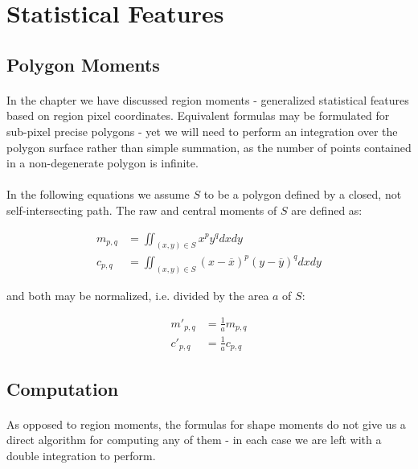 
\section{Statistical Features}

\subsection{Polygon Moments}

\paragraph*{}
In the  chapter we have discussed region moments - generalized statistical features based on region pixel coordinates. Equivalent formulas may be formulated for sub-pixel precise polygons - yet we will need to perform an integration over the polygon surface rather than simple summation, as the number of points contained in a non-degenerate polygon is infinite.

\paragraph*{}
In the following equations we assume $S$ to be a polygon defined by a closed, not self-intersecting path. The raw and central moments of $S$ are defined as:

\begin{align*}
	m_{p,q} &= \iint_{(x,y) \in S} x^p y^q dx dy \\
	c_{p,q} &= \iint_{(x,y) \in S} (x-\overline{x})^p (y-\overline{y})^q dx dy
\end{align*}

and both may be normalized, i.e. divided by the area $a$ of $S$:

\begin{align*}
	m'_{p,q} &= \frac{1}{a} m_{p,q}\\
	c'_{p,q} &= \frac{1}{a} c_{p,q}
\end{align*}

\subsection{Computation}

\paragraph*{}
As opposed to region moments, the formulas for shape moments do not give us a direct algorithm for computing any of them - in each case we are left with a double integration to perform.

